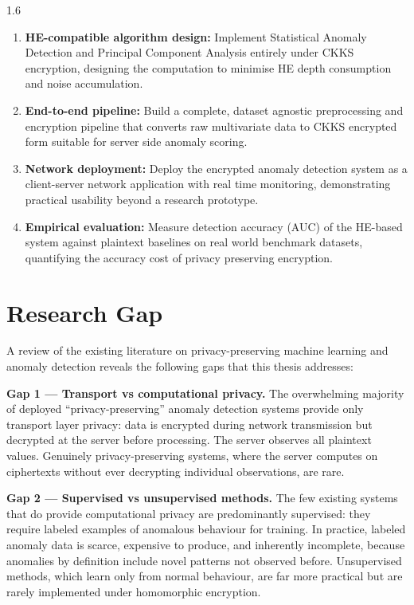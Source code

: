 \begin{spacing}{1.6}
\begin{enumerate}
  \item \textbf{HE-compatible algorithm design:} Implement Statistical Anomaly
  Detection and Principal Component Analysis entirely under CKKS encryption,
  designing the computation to minimise HE depth consumption and noise
  accumulation.

  \item \textbf{End-to-end pipeline:} Build a complete, dataset agnostic
  preprocessing and encryption pipeline that converts raw multivariate data to
  CKKS encrypted form suitable for server side anomaly scoring.

  \item \textbf{Network deployment:} Deploy the encrypted anomaly detection
  system as a client-server network application with real time monitoring,
  demonstrating practical usability beyond a research prototype.

  \item \textbf{Empirical evaluation:} Measure detection accuracy (AUC) of
  the HE-based system against plaintext baselines on real world benchmark
  datasets, quantifying the accuracy cost of privacy preserving encryption.
\end{enumerate}

\section{Research Gap}

A review of the existing literature on privacy-preserving machine learning
and anomaly detection reveals the following gaps that this thesis addresses:

\textbf{Gap 1 --- Transport vs computational privacy.} The overwhelming majority
of deployed ``privacy-preserving'' anomaly detection systems provide only
transport layer privacy: data is encrypted during network transmission but
decrypted at the server before processing. The server observes all plaintext
values. Genuinely privacy-preserving systems, where the server computes on
ciphertexts without ever decrypting individual observations, are rare.

\textbf{Gap 2 --- Supervised vs unsupervised methods.} The few existing systems
that do provide computational privacy are predominantly supervised: they require
labeled examples of anomalous behaviour for training. In practice, labeled
anomaly data is scarce, expensive to produce, and inherently incomplete, because
anomalies by definition include novel patterns not observed before. Unsupervised
methods, which learn only from normal behaviour, are far more practical but
are rarely implemented under homomorphic encryption.


\end{spacing}
